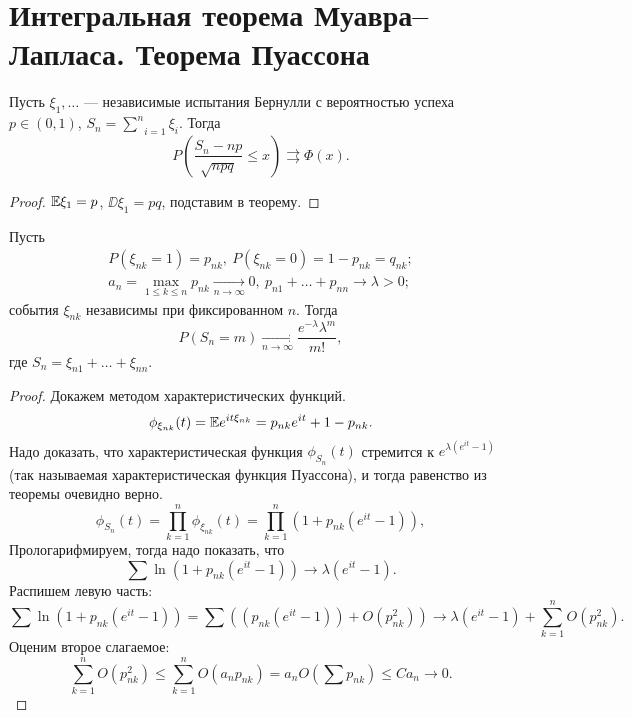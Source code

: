 \section{Интегральная теорема Муавра–Лапласа. Теорема Пуассона}

\begin{corollary} Пусть
    $\xi_1, \ldots$ --- независимые испытания Бернулли с вероятностью успеха $p\in (0, 1)$, $S_n = \underset{i = 1}{\overset{n}{\sum}} \xi_i$.
    Тогда $$P\left(\frac{S_n - np}{\sqrt{npq}}\le x\right) \rightrightarrows \Phi(x).$$
\end{corollary}

\begin{proof}
    $\mathbb{E} \xi_1 = p$, $ \DD\xi_1 = pq$, подставим в теорему.
\end{proof}

\begin{theorem}[Пуассона]
    Пусть 
    \begin{gather*}
        P(\xi_{nk} = 1) = p_{nk}, \ P(\xi_{nk} = 0) = 1- p_{nk} = q_{nk};\\
        a_n = \underset{1\le k\le n}{\max} p_{nk}\underset{n\rightarrow\infty}{\rightarrow} 0, \ p_{n1} +\ldots + p_{nn}\rightarrow \lambda > 0;
    \end{gather*}
   события $\xi_{nk}$ независимы при фиксированном $n$.
    Тогда 
    $$P(S_n = m)\underset{n\rightarrow\infty}{\rightarrow} \frac{e^{-\lambda} \lambda^m}{m!},$$
    где $S_n = \xi_{n1} + \ldots + \xi_{nn}$.
\end{theorem}

\begin{proof} Докажем методом характеристических функций.
    $$\phi_{\xi_{nk}}(t) = \mathbb{E} e^{it\xi_{nk}} = p_{nk}e^{it} + 1 - p_{nk}.$$
   Надо доказать, что характеристическая функция
    $\phi_{S_n}(t)$
    стремится к $e^{\lambda(e^{it} - 1)}$  (так называемая характеристическая функция Пуассона), и тогда равенство из теоремы очевидно верно.
     $$\phi_{S_n}(t) = \prod\limits_{k=1} ^ n \phi_{\xi_{nk}}(t) = \prod\limits_{k=1} ^ n (1+p_{nk}(e^{it} - 1)),$$
    Прологарифмируем, тогда надо показать, что
    $$\sum \ln(1+p_{nk}(e^{it} - 1)) \to \lambda (e^{it} - 1).$$
   Распишем левую часть:
    $$\sum \ln(1+p_{nk}(e^{it} - 1)) = \sum((p_{nk}(e^{it} - 1)) + O(p_{nk}^2)) \rightarrow  \lambda (e^{it} - 1) + \sum\limits_{k=1} ^ n O(p_{nk} ^ 2).$$
   Оценим второе слагаемое:
    $$\sum\limits_{k=1} ^ n O(p_{nk} ^ 2) \le \sum\limits_{k=1} ^ n O(a_np_{nk}) = a_n O\left(\sum p_{nk}\right) \le Ca_n \rightarrow 0.$$

\end{proof}